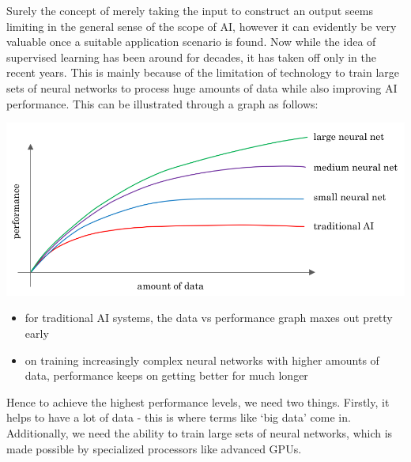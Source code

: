 \documentclass{article}[a4paper,12pt]
\theoremstyle{definition}
\begin{document}
Surely the concept of merely taking the input to construct an output seems limiting in the general sense of the scope of AI, however it can evidently be very valuable once a suitable application scenario is found. Now while the idea of supervised learning has been around for decades, it has taken off only in the recent years. This is mainly because of the limitation of technology to train large sets of neural networks to process huge amounts of data while also improving AI performance. This can be illustrated through a graph as follows:
\begin{center}\includegraphics[width=\textwidth]{data_vs_performance.png}\end{center}
\begin{itemize}
	\item for traditional AI systems, the data vs performance graph maxes out pretty early
	\item on training increasingly complex neural networks with higher amounts of data, performance keeps on getting better for much longer  
\end{itemize}
Hence to achieve the highest performance levels, we need two things. Firstly, it helps to have a lot of data - this is where terms like `big data' come in. Additionally, we need the ability to train large sets of neural networks, which is made possible by specialized processors like advanced GPUs.
\end{document}
